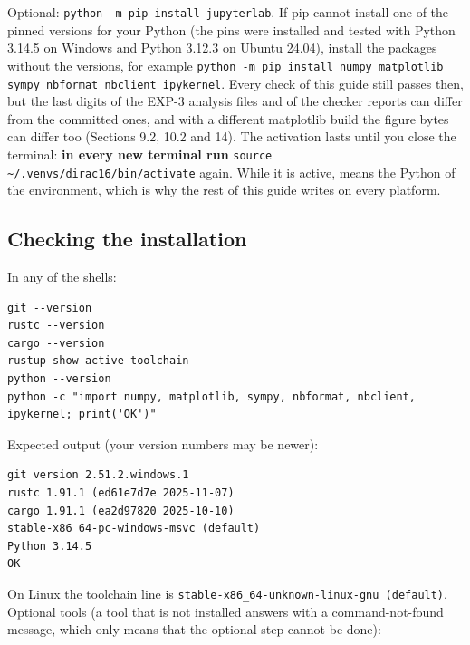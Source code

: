 \documentclass[11pt]{article}
\begin{document}
Optional: \texttt{python -\allowbreak{}m pip in\allowbreak{}stall ju\allowbreak{}pyterlab}. If pip cannot install one of the pinned versions for your Python (the pins were installed and tested with Python 3.14.5 on Windows and Python 3.12.3 on Ubuntu 24.04), install the packages without the \texttt{\detokenize{==}} versions, for example \texttt{python -\allowbreak{}m pip in\allowbreak{}stall nu\allowbreak{}mpy matp\allowbreak{}lotlib s\allowbreak{}ympy nbf\allowbreak{}ormat nb\allowbreak{}client i\allowbreak{}pykernel}. Every check of this guide still passes then, but the last digits of the EXP-3 analysis files and of the checker reports can differ from the committed ones, and with a different matplotlib build the figure bytes can differ too (Sections 9.2, 10.2 and 14). The activation lasts until you close the terminal: \textbf{in every new terminal run} \texttt{source \textasciitilde{}\allowbreak{}/.venvs/\allowbreak{}dirac16/\allowbreak{}bin/acti\allowbreak{}vate} again. While it is active, \texttt{} means the Python of the environment, which is why the rest of this guide writes \texttt{} on every platform.

\subsection{Checking the installation}

In any of the shells:

\begin{Verbatim}[fontsize=\small]
git --version
rustc --version
cargo --version
rustup show active-toolchain
python --version
python -c "import numpy, matplotlib, sympy, nbformat, nbclient, ipykernel; print('OK')"
\end{Verbatim}

Expected output (your version numbers may be newer):

\begin{Verbatim}[fontsize=\small]
git version 2.51.2.windows.1
rustc 1.91.1 (ed61e7d7e 2025-11-07)
cargo 1.91.1 (ea2d97820 2025-10-10)
stable-x86_64-pc-windows-msvc (default)
Python 3.14.5
OK
\end{Verbatim}

On Linux the toolchain line is \texttt{stable-x\allowbreak{}86\_64-un\allowbreak{}known-li\allowbreak{}nux-gnu \allowbreak{}(default\allowbreak{})}. Optional tools (a tool that is not installed answers with a command-not-found message, which only means that the optional step cannot be done):
\end{document}
